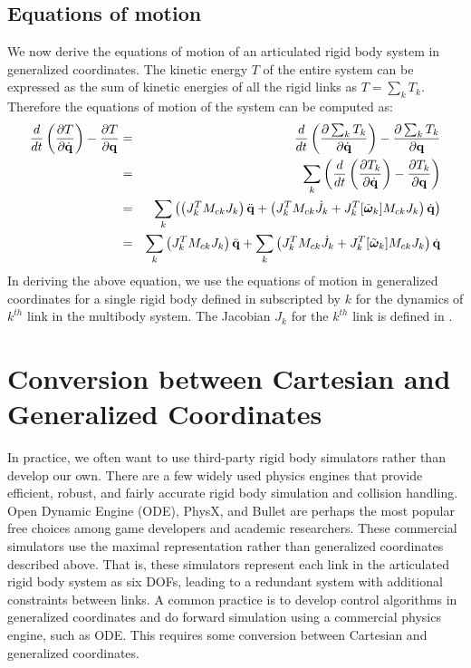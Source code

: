 \subsection{Equations of motion}
We now derive the equations of motion of an articulated rigid body system in generalized coordinates. The kinetic energy $T$ of the entire system can be expressed as the sum of kinetic energies of all the rigid links as $T=\sum_k T_k$. Therefore the equations of motion of the system can be computed as:
\begin{eqnarray}
\nonumber
\frac{d}{dt} \left ( \frac{\partial T}{\partial \dot{\mathbf{q}}} \right ) - \frac{\partial T}{\partial \mathbf{q}} & = & \frac{d}{dt} \left ( \frac{\partial \sum_k T_k}{\partial \dot{\mathbf{q}}} \right ) - \frac{\partial \sum_k T_k}{\partial \mathbf{q}}\\
\nonumber
& = & \sum_k \left ( \frac{d}{dt} \left ( \frac{\partial T_k}{\partial \dot{\mathbf{q}}} \right ) - \frac{\partial T_k}{\partial \mathbf{q}} \right )\\
\nonumber
& = & \sum_k \left ( \left( J_k^T M_{ck} J_k \right )\ddot{\mathbf{q}} + \left( J_k^T M_{ck} \dot{J}_k + J_k^T [\tilde{\bm{\omega}}_k]M_{ck} J_k \right )\dot{\mathbf{q}} \right )\\
& = &  \sum_k \left( J_k^T M_{ck} J_k \right )\ddot{\mathbf{q}} + \sum_k\left( J_k^T M_{ck} \dot{J}_k + J_k^T [\tilde{\bm{\omega}}_k]M_{ck} J_k \right )\dot{\mathbf{q}}
\end{eqnarray}
In deriving the above equation, we use the equations of motion in generalized coordinates for a single rigid body defined in  subscripted by $k$ for the dynamics of $k^{th}$ link in the multibody system. The Jacobian $J_k$ for the $k^{th}$ link is defined in .


\newpage
\section{Conversion between Cartesian and Generalized Coordinates}
In practice, we often want to use third-party rigid body simulators
rather than develop our own. There are a few widely used physics
engines that provide efficient, robust, and fairly accurate rigid body
simulation and collision handling. Open Dynamic Engine (ODE), PhysX, and
Bullet are perhaps the most popular free choices among game developers and
academic researchers. These commercial simulators use the maximal
representation rather than generalized coordinates
described above. That is, these simulators represent each link in the
articulated rigid body system as six DOFs,
leading to a redundant system with additional constraints between
links. A common practice is to develop control algorithms in
generalized coordinates and do forward simulation using a commercial
physics engine, such as ODE. This requires some conversion between
Cartesian and generalized coordinates.

